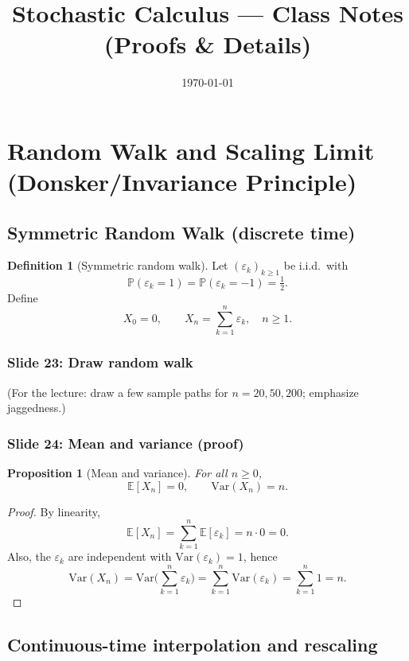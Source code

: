 \documentclass[11pt]{article}
\title{Stochastic Calculus --- Class Notes (Proofs \& Details)}
\date{\today}
\newtheorem{proposition}[theorem]{Proposition}
\theoremstyle{definition}
\newtheorem{definition}[theorem]{Definition}
\theoremstyle{remark}
\newcommand{\E}{\mathbb{E}}
\newcommand{\Pbb}{\mathbb{P}}
\newcommand{\Var}{\mathrm{Var}}
\begin{document}
\maketitle
\vspace{-1em}

\tableofcontents

\section{Random Walk and Scaling Limit (Donsker/Invariance Principle)}

\subsection{Symmetric Random Walk (discrete time)}

\begin{definition}[Symmetric random walk]
Let $(\varepsilon_k)_{k\ge1}$ be i.i.d.\ with
\[
\Pbb(\varepsilon_k=1)=\Pbb(\varepsilon_k=-1)=\tfrac12.
\]
Define
\[
X_0=0,\qquad X_n=\sum_{k=1}^n \varepsilon_k,\quad n\ge1.
\]
\end{definition}

\subsubsection*{Slide 23: Draw random walk}
(For the lecture: draw a few sample paths for $n=20,50,200$; emphasize jaggedness.)

\subsubsection*{Slide 24: Mean and variance (proof)}

\begin{proposition}[Mean and variance]
For all $n\ge0$,
\[
\E[X_n]=0,
\qquad
\Var(X_n)=n.
\]
\end{proposition}

\begin{proof}
By linearity,
\[
\E[X_n]=\sum_{k=1}^n \E[\varepsilon_k]=n\cdot 0=0.
\]
Also, the $\varepsilon_k$ are independent with $\Var(\varepsilon_k)=1$, hence
\[
\Var(X_n)=\Var\Big(\sum_{k=1}^n \varepsilon_k\Big)
=\sum_{k=1}^n \Var(\varepsilon_k)
=\sum_{k=1}^n 1
=n.
\]
\end{proof}

\subsection{Continuous-time interpolation and rescaling}
\end{document}

